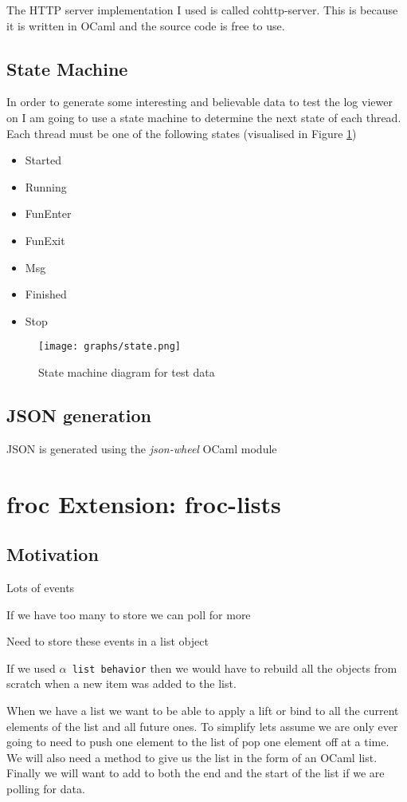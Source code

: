 The HTTP server implementation I used is called cohttp-server. This is because it is written in OCaml and the source code is free to use.

\subsection{State Machine}
In order to generate some interesting and believable data to test the log viewer on I am going to use a state machine to determine the next state of each thread. Each thread must be one of the following states (visualised in Figure \ref{state})
\begin{itemize}{}
\item Started
\item Running
\item FunEnter
\item FunExit
\item Msg
\item Finished
\item Stop
\end{itemize}

\begin{figure}
  \centering
  \texttt{[image: graphs/state.png]}
  \caption{State machine diagram for test data}
  \label{state}
\end{figure}

\subsection{JSON generation}
JSON is generated using the \emph{json-wheel} OCaml module

\section{froc Extension: froc-lists}
\subsection{Motivation}
Lots of events

If we have too many to store we can poll for more

Need to store these events in a list object

If we used \texttt{\textnormal{$\alpha$} list behavior} then we would have to rebuild all the objects from scratch when a new item was added to the list.

When we have a list we want to be able to apply a lift or bind to all the current elements of the list and all future ones. To simplify lets assume we are only ever going to need to push one element to the list of pop one element off at a time. We will also need a method to give us the list in the form of an OCaml list. Finally we will want to add to both the end and the start of the list if we are polling for data.

